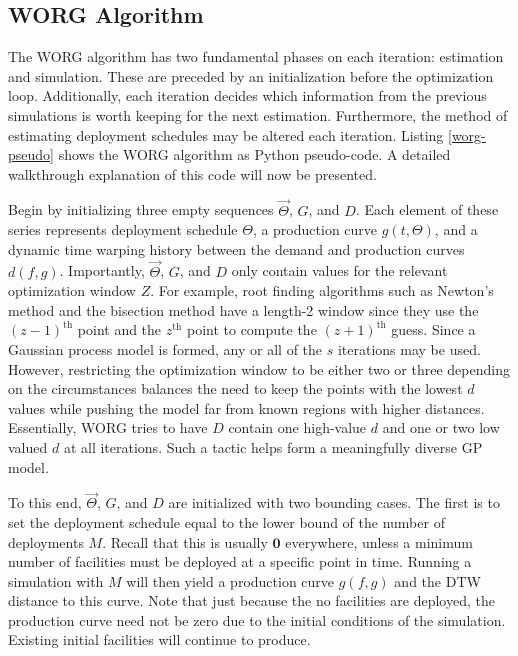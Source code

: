 \subsection{WORG Algorithm}
\label{algo}

The WORG algorithm has two fundamental phases on each iteration:
estimation and simulation.  These are preceded by an initialization 
before the optimization loop. Additionally, each iteration decides 
which information from the previous simulations is worth keeping for the
next estimation. Furthermore, the method of estimating deployment 
schedules may be altered each iteration.  Listing \ref{worg-pseudo}
shows the WORG algorithm as Python pseudo-code. A detailed walkthrough 
explanation of this code will now be presented.

Begin by initializing three empty sequences $\vec{\Theta}$, $G$, and $D$.
Each element of these series represents deployment schedule $\Theta$, 
a production curve $g(t, \Theta)$, and a dynamic time warping history 
between the demand and production curves $d(f, g)$.
Importantly, $\vec{\Theta}$, $G$, and $D$ only contain values for
the relevant optimization window $Z$. For example, root finding algorithms
such as Newton's method and the bisection method have a length-2 window
since they use the $(z-1)^\mathrm{th}$ point and the $z^\mathrm{th}$ point
to compute the $(z+1)^\mathrm{th}$ guess. Since a Gaussian process model is 
formed, any or all of the $s$ iterations may be used. However, 
restricting the optimization window to be either two or three depending on 
the 
circumstances balances the need to keep the points with the lowest $d$ 
values while pushing the model far from known regions with higher 
distances. Essentially, WORG tries to have $D$ contain one high-value $d$
and one or two low valued $d$ at all iterations. Such a tactic helps
form a meaningfully diverse GP model.

To this end, $\vec{\Theta}$, $G$, and $D$ are initialized with two 
bounding cases. The first is to set the deployment schedule equal to the
lower bound of the number of deployments $M$.  Recall that this is 
usually $\mathbf{0}$ everywhere, unless a minimum number of facilities 
must be deployed at a specific point in time. Running a simulation with 
$M$ will then yield a production curve $g(f, g)$ and the DTW distance to
this curve.  Note that just because the no facilities are deployed, the 
production curve need not be zero due to the initial conditions of the 
simulation. Existing initial facilities will continue to produce. 

